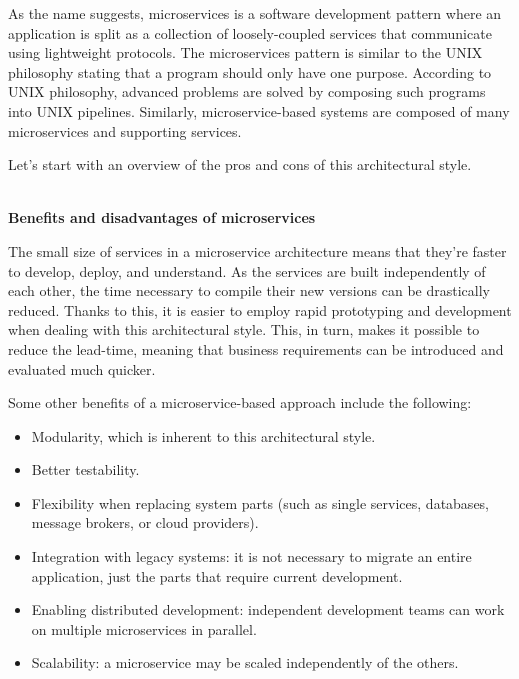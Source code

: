 As the name suggests, microservices is a software development pattern where an application is split as a collection of loosely-coupled services that communicate using lightweight protocols. The microservices pattern is similar to the UNIX philosophy stating that a program should only have one purpose. According to UNIX philosophy, advanced problems are solved by composing such programs into UNIX pipelines. Similarly, microservice-based systems are composed of many microservices and supporting services.

Let's start with an overview of the pros and cons of this architectural style.


\hspace*{\fill} \\ %
\noindent
\textbf{Benefits and disadvantages of microservices}

The small size of services in a microservice architecture means that they're faster to develop, deploy, and understand. As the services are built independently of each other, the time necessary to compile their new versions can be drastically reduced. Thanks to this, it is easier to employ rapid prototyping and development when dealing with this architectural style. This, in turn, makes it possible to reduce the lead-time, meaning that business requirements can be introduced and evaluated much quicker.

Some other benefits of a microservice-based approach include the following:


\begin{itemize}
\item
Modularity, which is inherent to this architectural style.

\item
Better testability.

\item
Flexibility when replacing system parts (such as single services, databases, message brokers, or cloud providers).

\item
Integration with legacy systems: it is not necessary to migrate an entire application, just the parts that require current development.

\item
Enabling distributed development: independent development teams can work on multiple microservices in parallel.

\item
Scalability: a microservice may be scaled independently of the others.
\end{itemize}


